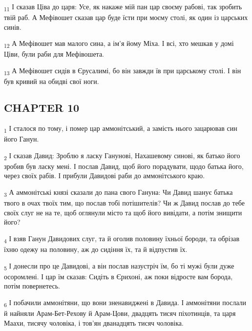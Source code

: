 \begin{tcolorbox}
\textsubscript{11} І сказав Ціва до царя: Усе, як накаже мій пан цар своєму рабові, так зробить твій раб. А Мефівошет сказав цар буде їсти при моєму столі, як один із царських синів.
\end{tcolorbox}
\begin{tcolorbox}
\textsubscript{12} А Мефівошет мав малого сина, а ім'я йому Міха. І всі, хто мешкав у домі Ціви, були раби для Мефівошета.
\end{tcolorbox}
\begin{tcolorbox}
\textsubscript{13} А Мефівошет сидів в Єрусалимі, бо він завжди їв при царському столі. І він був кривий на обидві свої ноги.
\end{tcolorbox}
\subsection{CHAPTER 10}
\begin{tcolorbox}
\textsubscript{1} І сталося по тому, і помер цар аммонітський, а замість нього зацарював син його Ганун.
\end{tcolorbox}
\begin{tcolorbox}
\textsubscript{2} І сказав Давид: Зроблю я ласку Ганунові, Нахашевому синові, як батько його зробив був ласку мені. І послав Давид, щоб його порадувати, щодо батька його, через своїх рабів. І прибули Давидові раби до аммонітського краю.
\end{tcolorbox}
\begin{tcolorbox}
\textsubscript{3} А аммонітські князі сказали до пана свого Гануна: Чи Давид шанує батька твого в очах твоїх тим, що послав тобі потішителів? Чи ж Давид послав до тебе своїх слуг не на те, щоб оглянули місто та щоб його вивідати, а потім знищити його?
\end{tcolorbox}
\begin{tcolorbox}
\textsubscript{4} І взяв Ганун Давидових слуг, та й оголив половину їхньої бороди, та обрізав їхню одежу на половину, аж до сидіння їх, та й відпустив їх.
\end{tcolorbox}
\begin{tcolorbox}
\textsubscript{5} І донесли про це Давидові, а він послав назустріч їм, бо ті мужі були дуже осоромлені. І цар їм сказав: Сидіть в Єрихоні, аж поки відросте вам борода, потім повернетесь.
\end{tcolorbox}
\begin{tcolorbox}
\textsubscript{6} І побачили аммонітяни, що вони зненавиджені в Давида. І аммонітяни послали й найняли Арам-Бет-Рехову й Арам-Цови, двадцять тисяч піхотинців, та царя Маахи, тисячу чоловіка, і тов'ян дванадцять тисяч чоловіка.
\end{tcolorbox}
